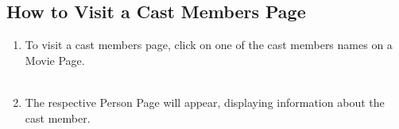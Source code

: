 \documentclass[12pt,a4paper]{article}
\begin{document}
			\subsection{How to Visit a Cast Members Page}
				\begin{enumerate}
					\item To visit a cast members page, click on one of the cast members names on a Movie Page.\\\\
					\item The respective Person Page will appear, displaying information about the cast member.\\\\
				\end{enumerate}
			
			\newpage
\end{document}
